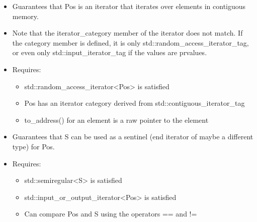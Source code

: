 
\begin{itemize}
\item
Guarantees that Pos is an iterator that iterates over elements in contiguous memory.

\item
Note that the iterator\_category member of the iterator does not match. If the category member is defined, it is only std::random\_access\_iterator\_tag, or even only std::input\_iterator\_tag if the values are prvalues.

\item
Requires:
\begin{itemize}
\item
std::random\_access\_iterator<Pos> is satisfied

\item
Pos has an iterator category derived from std::contiguous\_iterator\_tag

\item
to\_address() for an element is a raw pointer to the element
\end{itemize}
\end{itemize}


\begin{itemize}
\item
Guarantees that S can be used as a sentinel (end iterator of maybe a different type) for Pos.

\item
Requires:
\begin{itemize}
\item
std::semiregular<S> is satisfied

\item
std::input\_or\_output\_iterator<Pos> is satisfied

\item
Can compare Pos and S using the operators == and !=
\end{itemize}
\end{itemize}


